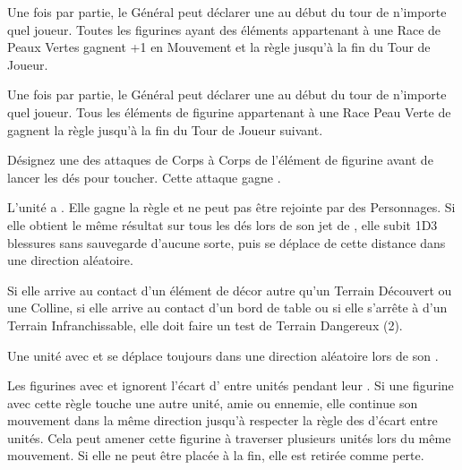 \begin{multicols}{2}\raggedcolumns
\setlength{\columnseprule}{1pt}
\armyspecialruleentry{\waaargh}

Une fois par partie, le Général peut déclarer une \waaargh{} au début du tour de n'importe quel joueur. Toutes les figurines ayant des éléments appartenant à une Race de Peaux Vertes gagnent +1 en Mouvement et la règle \swiftstride{} jusqu'à la fin du Tour de Joueur.

\columnbreak
\armyspecialruleentry{\greentide}

Une fois par partie, le Général peut déclarer une \greentide{} au début du tour de n'importe quel joueur. Tous les éléments de figurine appartenant à une Race Peau Verte de \goblins{} gagnent la règle \fightinextrarank{} jusqu'à la fin du Tour de Joueur suivant.

\end{multicols}

\armyspecialruleentry{\venomousfangs}

Désignez une des attaques de Corps à Corps de l'élément de figurine avant de lancer les dés pour toucher. Cette attaque gagne \multiplewounds{\ordnance}{}.


L'unité a . Elle gagne la règle \immunetopsychology{} et ne peut pas être rejointe par des Personnages. Si elle obtient le même résultat sur tous les dés lors de son jet de \randommovement{}, elle subit 1D3 blessures sans sauvegarde d'aucune sorte, puis se déplace de cette distance dans une direction aléatoire.

Si elle arrive au contact d'un élément de décor autre qu'un Terrain Découvert ou une Colline, si elle arrive au contact d'un bord de table ou si elle s'arrête à  d'un Terrain Infranchissable, elle doit faire un test de Terrain Dangereux (2).

\armyspecialruleentry{\runningamok}

Une unité avec \shambolic{} et \runningamok{} se déplace toujours dans une direction aléatoire lors de son \randommovement{}.


Les figurines avec \shambolic{} et \ricochet{} ignorent l'écart d' entre unités pendant leur \randommovement{}. Si une figurine avec cette règle touche une autre unité, amie ou ennemie, elle continue son mouvement dans la même direction jusqu'à respecter la règle des  d'écart entre unités. Cela peut amener cette figurine à traverser plusieurs unités lors du même mouvement. Si elle ne peut être placée à la fin, elle est retirée comme perte.


